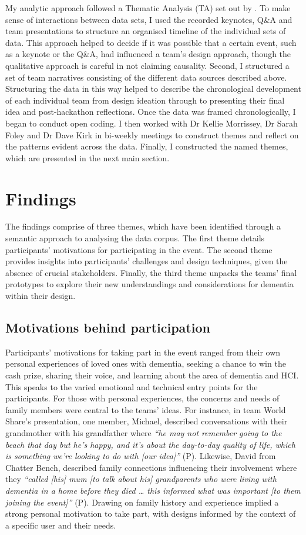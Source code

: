 My analytic approach followed a Thematic Analysis (TA) set out by \cite{braun_one_2020,braun_using_2006}. To make sense of interactions between data sets, I used the recorded keynotes, Q\&A and team presentations to structure an organised timeline of the individual sets of data. This approach helped to decide if it was possible that a certain event, such as a keynote or the Q\&A, had influenced a team's design approach, though the qualitative approach is careful in not claiming causality. Second, I structured a set of team narratives consisting of the different data sources described above. Structuring the data in this way helped to describe the chronological development of each individual team from design ideation through to presenting their final idea and post-hackathon reflections.  Once the data was framed chronologically, I began to conduct open coding. I then worked with Dr Kellie Morrissey, Dr Sarah Foley and Dr Dave Kirk in bi-weekly meetings to construct themes and reflect on the patterns evident across the data. Finally, I constructed the named themes, which are presented in the next main section. 

\section{Findings}
\label{sec:Findings}
The findings comprise of three themes, which have been identified through a semantic approach to analysing the data corpus. The first theme details participants’ motivations for participating in the event. The second theme provides insights into participants' challenges and design techniques, given the absence of crucial stakeholders. Finally, the third theme unpacks the teams’ final prototypes to explore their new understandings and considerations for dementia within their design.

\subsection{Motivations behind participation}
\label{ThemeOne:subthemeOne}
Participants’ motivations for taking part in the event ranged from their own personal experiences of loved ones with dementia, seeking a chance to win the cash prize, sharing their voice, and learning about the area of dementia and HCI. This speaks to the varied emotional and technical entry points for the participants. For those with personal experiences, the concerns and needs of family members were central to the teams’ ideas. For instance, in team World Share’s presentation, one member, Michael, described conversations with their grandmother with his grandfather where \textit{``he may not remember going to the beach that day but he’s happy, and it’s about the day-to-day quality of life, which is something we’re looking to do with [our idea]''} (P). Likewise, David from Chatter Bench, described family connections influencing their involvement where they \textit{``called [his] mum [to talk about his] grandparents who were living with dementia in a home before they died … this informed what was important [to them joining the event]''} (P). Drawing on family history and experience implied a strong personal motivation to take part, with designs informed by the context of a specific user and their needs.  


